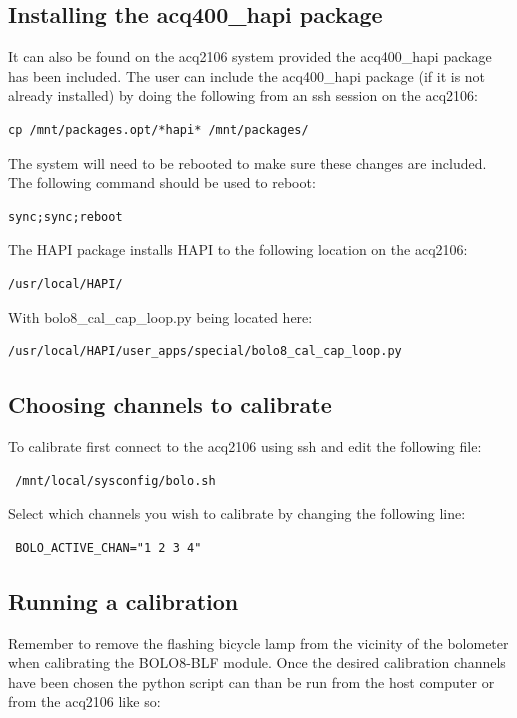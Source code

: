 \documentclass{article}
\begin{document}
\subsection{Installing the acq400\_hapi package}
It can also be found on the acq2106 system provided the acq400\_hapi package has been included.
The user can include the acq400\_hapi package (if it is not already installed) by doing the following from an ssh session on the acq2106:
\begin{verbatim}cp /mnt/packages.opt/*hapi* /mnt/packages/\end{verbatim}
The system will need to be rebooted to make sure these changes are included.
The following command should be used to reboot:
\begin{verbatim}sync;sync;reboot\end{verbatim}

The HAPI package installs HAPI to the following location on the acq2106:

\begin{verbatim}
/usr/local/HAPI/
\end{verbatim}

With bolo8\_cal\_cap\_loop.py being located here:

\begin{verbatim}
/usr/local/HAPI/user_apps/special/bolo8_cal_cap_loop.py
\end{verbatim}

\subsection{Choosing channels to calibrate}

To calibrate first connect to the acq2106 using ssh and edit the following file:

\begin{verbatim} /mnt/local/sysconfig/bolo.sh \end{verbatim}

Select which channels you wish to calibrate by changing the following line:

\begin{verbatim} BOLO_ACTIVE_CHAN="1 2 3 4" \end{verbatim}

\subsection{Running a calibration}

Remember to remove the flashing bicycle lamp from the vicinity of the bolometer when calibrating the BOLO8-BLF module.
Once the desired calibration channels have been chosen the python script can than be run from the host computer or from the acq2106 like so:
\end{document}
